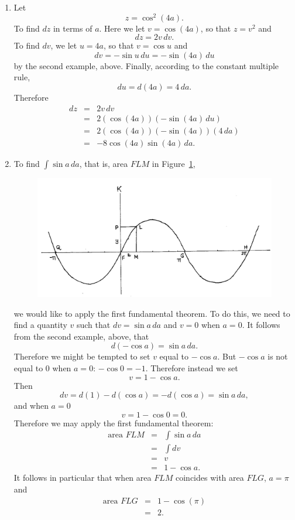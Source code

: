 \documentclass[twoside,openright]{article}
\begin{document}
\begin{enumerate}
\item Let 
$$z = \cos^2 (4a).$$
To find $dz$ in terms of $a$.  Here we let $v= \cos (4a)$, so that $z = v^2$ and 
$$dz = 2v\,dv.$$
To find $dv$, we let $u = 4a$, so that $v = \cos u$ and
$$dv =  -\sin u \,du = -\sin(4a)\,du$$
by the second example, above.  Finally, according to the constant multiple rule,
$$du = d(4a) = 4\,da.$$
Therefore 
\begin{eqnarray*}
dz & = & 2v\,dv\\
& = & 2(\cos(4a))(-\sin(4a)\,du)\\
& = & 2(\cos(4a))(-\sin(4a))(4\,da)\\
& = & -8\cos(4a)\sin(4a)\,da.
\end{eqnarray*}


\item \label{sumsin}To find $\int \sin a \,da$, that is, area $FLM$ in Figure~\ref{sinecurve2},
\begin{figure}[htp]
\begin{center}
\includegraphics[width=\textwidth]{fig/Figure48}
\caption{}
\label{sinecurve2}
\vspace{-10pt}
\end{center}
\end{figure} 
we would like to apply the first fundamental theorem.  To do this, we need to find a quantity $v$ such that $dv = \sin a\,da$ and $v=0$ when $a=0$.  It follows from the second example, above, that
$$d(-\cos a) = \sin a\,da.$$ 
Therefore we might be tempted to set $v$ equal to $-\cos a$.  But $-\cos a$ is not equal to 0 when $a=0$: $-\cos 0 = -1$.  Therefore instead we set 
$$v = 1-\cos a.$$
Then 
$$dv = d(1) -d(\cos a) = -d(\cos a) = \sin a\,da,$$
and when $a=0$ 
$$v = 1 - \cos 0 = 0.$$
Therefore we may apply the first fundamental theorem:
\begin{eqnarray*}
\mbox{area }FLM & = & \int\! \sin a \,da \\
& = & \int\! dv \\
& = & v\\
& = & 1 - \cos a.
\end{eqnarray*}
It follows in particular that when area $FLM$ coincides with area $FLG$, $a= \pi$ and
\begin{eqnarray*}
\mbox{area }FLG & = & 1 - \cos (\pi)\\
& = & 2.
\end{eqnarray*}


\end{enumerate}
\end{document}
